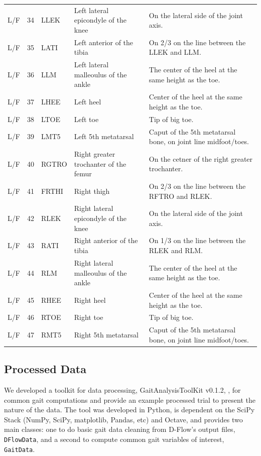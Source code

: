 \documentclass[fleqn,12pt]{wlpeerj}
\begin{document}
\begin{table}
\begin{tabular}{lrlll}
    L/F & 34 & LLEK  & Left lateral epicondyle of the knee   & On the lateral side of the joint axis. \\
    L/F & 35 & LATI  & Left anterior of the tibia            & On 2/3 on the line between the LLEK and LLM. \\
    L/F & 36 & LLM   & Left lateral malleoulus of the ankle  & The center of the heel at the same height as the toe. \\
    L/F & 37 & LHEE  & Left heel                             & Center of the heel at the same height as the toe. \\
    L/F & 38 & LTOE  & Left toe                              & Tip of big toe. \\
    L/F & 39 & LMT5  & Left 5th metatarsal                   & Caput of the 5th metatarsal bone, on joint line midfoot/toes. \\
    L/F & 40 & RGTRO & Right greater trochanter of the femur & On the cetner of the right greater trochanter. \\
    L/F & 41 & FRTHI & Right thigh                           & On 2/3 on the line between the RFTRO and RLEK. \\
    L/F & 42 & RLEK  & Right lateral epicondyle of the knee  & On the lateral side of the joint axis. \\
    L/F & 43 & RATI  & Right anterior of the tibia           & On 1/3 on the line between the RLEK and RLM. \\
    L/F & 44 & RLM   & Right lateral malleoulus of the ankle & The center of the heel at the same height as the toe. \\
    L/F & 45 & RHEE  & Right heel                            & Center of the heel at the same height as the toe. \\
    L/F & 46 & RTOE  & Right toe                             & Tip of big toe. \\
    L/F & 47 & RMT5  & Right 5th metatarsal                  & Caput of the 5th metatarsal bone, on joint line midfoot/toes. \\
    \bottomrule
  \end{tabular}
  \label{tab:marker-labels}
\end{table}

\subsection*{Processed Data}
%
We developed a toolkit for data processing, GaitAnalysisToolKit v0.1.2,
\cite{Moore2014a}, for common gait computations and provide an example
processed trial to present the nature of the data. The tool was developed in
Python, is dependent on the SciPy Stack (NumPy, SciPy, matplotlib, Pandas, etc)
and Octave, and provides two main classes: one to do basic gait data cleaning
from D-Flow's output files, \verb|DFlowData|, and a second to compute common
gait variables of interest, \verb|GaitData|.
\end{document}
